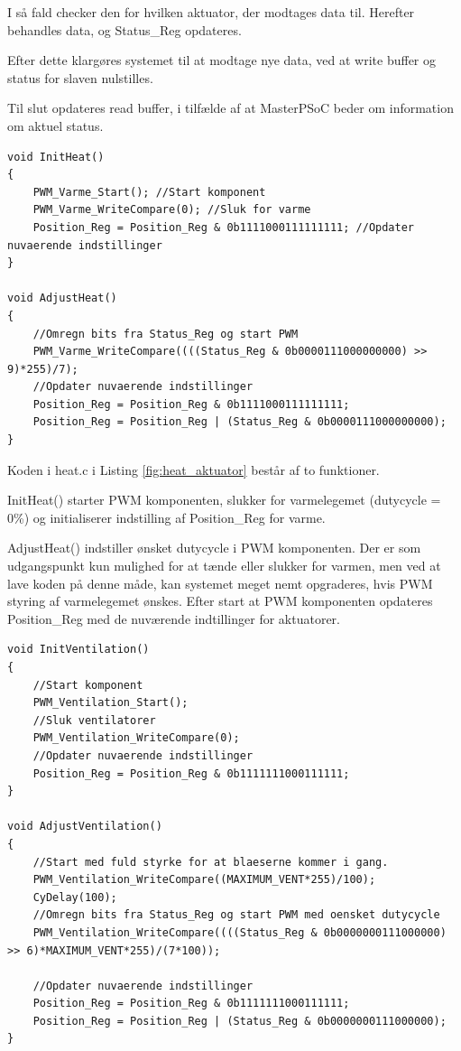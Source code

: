 I så fald checker den for hvilken aktuator, der modtages data til.
Herefter behandles data, og Status\_Reg opdateres.

Efter dette klargøres systemet til at modtage nye data, ved at write buffer og status for slaven nulstilles.

Til slut opdateres read buffer, i tilfælde af at MasterPSoC beder om information om aktuel status. 
\newline
\begin{lstlisting}[caption=Udsnit af heat.c for PSoC4 i Aktuator, label=fig:heat_aktuator]
void InitHeat()
{   
    PWM_Varme_Start(); //Start komponent
    PWM_Varme_WriteCompare(0); //Sluk for varme
    Position_Reg = Position_Reg & 0b1111000111111111; //Opdater nuvaerende indstillinger
}

void AdjustHeat()
{
    //Omregn bits fra Status_Reg og start PWM
    PWM_Varme_WriteCompare((((Status_Reg & 0b0000111000000000) >> 9)*255)/7);
    //Opdater nuvaerende indstillinger
    Position_Reg = Position_Reg & 0b1111000111111111;
    Position_Reg = Position_Reg | (Status_Reg & 0b0000111000000000);
}
\end{lstlisting}

Koden i heat.c i Listing \ref{fig:heat_aktuator} består af to funktioner. 

InitHeat() starter PWM komponenten, slukker for varmelegemet (dutycycle = 0\%) og initialiserer indstilling af Position\_Reg for varme.

AdjustHeat() indstiller ønsket dutycycle i PWM komponenten. 
Der er som udgangspunkt kun mulighed for at tænde eller slukker for varmen, men ved at lave koden på denne måde, kan systemet meget nemt opgraderes, hvis PWM styring af varmelegemet ønskes. 
Efter start at PWM komponenten opdateres Position\_Reg med de nuværende indtillinger for aktuatorer.

\clearpage

\begin{lstlisting}[caption=Udsnit af ventilation.c for PSoC4 i Aktuator, label=fig:ventilation_aktuator]
void InitVentilation()
{
    //Start komponent
    PWM_Ventilation_Start();
    //Sluk ventilatorer
    PWM_Ventilation_WriteCompare(0);
    //Opdater nuvaerende indstillinger
    Position_Reg = Position_Reg & 0b1111111000111111;
}

void AdjustVentilation()
{
    //Start med fuld styrke for at blaeserne kommer i gang.
    PWM_Ventilation_WriteCompare((MAXIMUM_VENT*255)/100);
    CyDelay(100);
    //Omregn bits fra Status_Reg og start PWM med oensket dutycycle
    PWM_Ventilation_WriteCompare((((Status_Reg & 0b0000000111000000) >> 6)*MAXIMUM_VENT*255)/(7*100));
    
    //Opdater nuvaerende indstillinger
    Position_Reg = Position_Reg & 0b1111111000111111;
    Position_Reg = Position_Reg | (Status_Reg & 0b0000000111000000);
}
\end{lstlisting}

